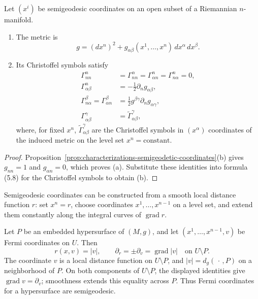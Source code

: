 \begin{corollary}
\label{cor:semigeodesic-metric-christoffel}

Let $(x^i)$ be semigeodesic coordinates on an open subset of a Riemannian
$n$-manifold.
\begin{enumerate}
\item[(a)] The metric is
\[
g=(dx^n)^2+g_{\alpha\beta}(x^1,\ldots,x^n)\,dx^\alpha\,dx^\beta.
\]
\item[(b)] Its Christoffel symbols satisfy
\begin{align*}
\Gamma^n_{nn}&=\Gamma^\alpha_{nn}=\Gamma^n_{\alpha n}
=\Gamma^n_{n\alpha}=0,\\
\Gamma^n_{\alpha\beta}&=-\frac12\partial_ng_{\alpha\beta},\\
\Gamma^\beta_{n\alpha}=\Gamma^\beta_{\alpha n}
&=\frac12g^{\beta\gamma}\partial_ng_{\alpha\gamma},\\
\Gamma^\gamma_{\alpha\beta}&=\widetilde\Gamma^\gamma_{\alpha\beta},
\end{align*}
where, for fixed $x^n$, $\widetilde\Gamma^\gamma_{\alpha\beta}$ are the
Christoffel symbols in $(x^\alpha)$ coordinates of the induced metric on the
level set $x^n=\text{constant}$.
\end{enumerate}
\end{corollary}

\begin{proof}
\sketch Proposition~\ref{prop:characterizations-semigeodetic-coordinates}(b)
gives $g_{nn}=1$ and $g_{\alpha n}=0$, which proves (a). Substitute these
identities into formula (5.8) for the Christoffel symbols to obtain (b).
\end{proof}

Semigeodesic coordinates can be constructed from a smooth local distance
function $r$: set $x^n=r$, choose coordinates $x^1,\ldots,x^{n-1}$ on a level
set, and extend them constantly along the integral curves of
$\operatorname{grad}r$.

\begin{example}
\label{ex:fermi-coordinates-hypersurface}

Let $P$ be an embedded hypersurface of $(M,g)$, and let
$(x^1,\ldots,x^{n-1},v)$ be Fermi coordinates on $U$. Then
\[
r(x,v)=|v|,
\qquad
\partial_r=\pm\partial_v=\operatorname{grad}|v|
\quad\text{on }U\setminus P.
\]
The coordinate $v$ is a local distance function on $U\setminus P$, and
$|v|=d_g(\,\cdot\,,P)$ on a neighborhood of $P$. On both components of
$U\setminus P$, the displayed identities give
$\operatorname{grad}v=\partial_v$; smoothness extends this equality across
$P$. Thus Fermi coordinates for a hypersurface are semigeodesic.
\end{example}

